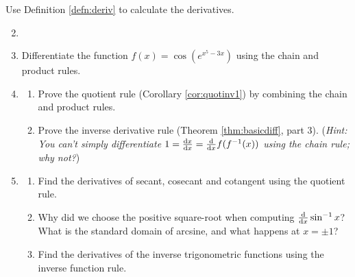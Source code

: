 \begin{exercises}{}
\exstart Use Definition \ref{defn:deriv} to calculate the derivatives.
\begin{enumerate}\setcounter{enumi}{1}
  

	\item[]
  
  \item Differentiate the function $f(x)=\cos\left(e^{x^5-3x}\right)$ using the chain and product rules.
  
  \item\begin{enumerate}
    \item Prove the quotient rule (Corollary \ref{cor:quotinv1}) by combining the chain and product rules.
  	\item Prove the inverse derivative rule (Theorem \ref{thm:basicdiff}, part 3).\smallbreak
  	(\emph{Hint: You can't simply differentiate $1=\diff[x]x=\diff xf(f^{-1}(x))$ using the chain rule; why not?})
  \end{enumerate}
  
  
  
  \item\begin{enumerate}
    \item Find the derivatives of secant, cosecant and cotangent using the quotient rule.
    \item Why did we choose the positive square-root when computing $\diff x\sin^{-1}x$? What is the standard domain of arcsine, and what happens at $x=\pm 1$?
    \item Find the derivatives of the inverse trigonometric functions using the inverse function rule.
  \end{enumerate}
  

\end{enumerate}
\end{exercises}
